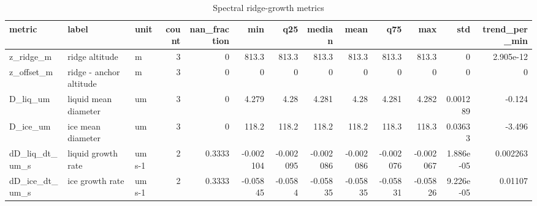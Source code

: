 \begin{table}[htbp]
\centering
\small
\caption{Spectral ridge-growth metrics}
\label{tab:growth_bundle_metrics}
\begin{tabular}{lllrrrrrrrrrr}
\toprule
metric & label & unit & count & nan\_fraction & min & q25 & median & mean & q75 & max & std & trend\_per\_min \\
\midrule
z\_ridge\_m & ridge altitude & m & 3 & 0 & 813.3 & 813.3 & 813.3 & 813.3 & 813.3 & 813.3 & 0 & 2.905e-12 \\
z\_offset\_m & ridge - anchor altitude & m & 3 & 0 & 0 & 0 & 0 & 0 & 0 & 0 & 0 & 0 \\
D\_liq\_um & liquid mean diameter & um & 3 & 0 & 4.279 & 4.28 & 4.281 & 4.28 & 4.281 & 4.282 & 0.001289 & -0.124 \\
D\_ice\_um & ice mean diameter & um & 3 & 0 & 118.2 & 118.2 & 118.2 & 118.2 & 118.3 & 118.3 & 0.03633 & -3.496 \\
dD\_liq\_dt\_um\_s & liquid growth rate & um s-1 & 2 & 0.3333 & -0.002104 & -0.002095 & -0.002086 & -0.002086 & -0.002076 & -0.002067 & 1.886e-05 & 0.002263 \\
dD\_ice\_dt\_um\_s & ice growth rate & um s-1 & 2 & 0.3333 & -0.05845 & -0.0584 & -0.05835 & -0.05835 & -0.05831 & -0.05826 & 9.226e-05 & 0.01107 \\
\bottomrule
\end{tabular}

\end{table}
